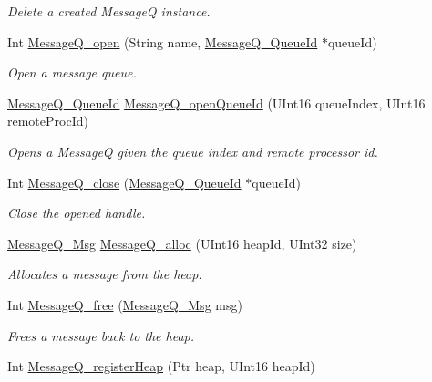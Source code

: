 \begin{DoxyCompactItemize}
\begin{DoxyCompactList}\small\item\em Delete a created Message\-Q instance. \end{DoxyCompactList}\item 
Int \hyperlink{_message_q_8h_af9e6bd0c1dbb236eb4a618211bf15325}{Message\-Q\-\_\-open} (String name, \hyperlink{_message_q_8h_a34dd32b58cf0476c2d90e3f702843297}{Message\-Q\-\_\-\-Queue\-Id} $\ast$queue\-Id)
\begin{DoxyCompactList}\small\item\em Open a message queue. \end{DoxyCompactList}\item 
\hyperlink{_message_q_8h_a34dd32b58cf0476c2d90e3f702843297}{Message\-Q\-\_\-\-Queue\-Id} \hyperlink{_message_q_8h_ac725833eb72ca8fcb33978377d036fcc}{Message\-Q\-\_\-open\-Queue\-Id} (U\-Int16 queue\-Index, U\-Int16 remote\-Proc\-Id)
\begin{DoxyCompactList}\small\item\em Opens a Message\-Q given the queue index and remote processor id. \end{DoxyCompactList}\item 
Int \hyperlink{_message_q_8h_ab2cdb25f8e9fec3fe3f17a43c0b85bed}{Message\-Q\-\_\-close} (\hyperlink{_message_q_8h_a34dd32b58cf0476c2d90e3f702843297}{Message\-Q\-\_\-\-Queue\-Id} $\ast$queue\-Id)
\begin{DoxyCompactList}\small\item\em Close the opened handle. \end{DoxyCompactList}\item 
\hyperlink{_message_q_8h_ab675d3cdd0443a1ad05658d375458204}{Message\-Q\-\_\-\-Msg} \hyperlink{_message_q_8h_ad8de6381a05a4d8a672d06a3b5676a24}{Message\-Q\-\_\-alloc} (U\-Int16 heap\-Id, U\-Int32 size)
\begin{DoxyCompactList}\small\item\em Allocates a message from the heap. \end{DoxyCompactList}\item 
Int \hyperlink{_message_q_8h_ac7ac95bf02e7366b353e728b15d76852}{Message\-Q\-\_\-free} (\hyperlink{_message_q_8h_ab675d3cdd0443a1ad05658d375458204}{Message\-Q\-\_\-\-Msg} msg)
\begin{DoxyCompactList}\small\item\em Frees a message back to the heap. \end{DoxyCompactList}\item 
Int \hyperlink{_message_q_8h_ab74ba85e9c7ebbb1a888df871fd2a6c6}{Message\-Q\-\_\-register\-Heap} (Ptr heap, U\-Int16 heap\-Id)

\end{DoxyCompactItemize}
